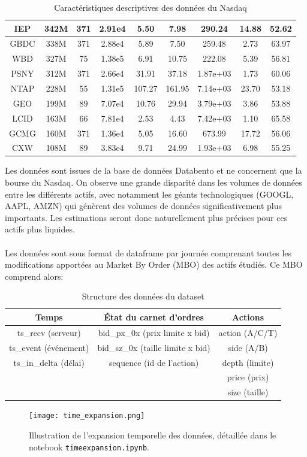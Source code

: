 \documentclass[10pt,a4paper]{article}
\theoremstyle{definition}
\theoremstyle{remark}
\begin{document}
\begin{table}[h!]
\begin{tabular}{|c|c|c|c|c|c|c|c|c|}
IEP & 342M & 371 & 2.91e4 & 5.50 & 7.98 & 290.24 & 14.88 & 52.62 \\ \hline
GBDC & 338M & 371 & 2.88e4 & 5.89 & 7.50 & 259.48 & 2.73 & 63.97 \\ \hline
WBD & 327M & 75 & 1.38e5 & 6.91 & 10.75 & 222.08 & 5.39 & 56.81 \\ \hline
PSNY & 312M & 371 & 2.66e4 & 31.91 & 37.18 & 1.87e+03 & 1.73 & 60.06 \\ \hline
NTAP & 228M & 55 & 1.31e5 & 107.27 & 161.95 & 7.14e+03 & 23.70 & 53.18 \\ \hline
GEO & 199M & 89 & 7.07e4 & 10.76 & 29.94 & 3.79e+03 & 3.86 & 53.88 \\ \hline
LCID & 163M & 66 & 7.81e4 & 2.53 & 4.43 & 7.42e+03 & 1.10 & 65.58 \\ \hline
GCMG & 160M & 371 & 1.36e4 & 5.05 & 16.60 & 673.99 & 17.72 & 56.06 \\ \hline
CXW & 108M & 89 & 3.83e4 & 9.71 & 24.99 & 1.93e+03 & 6.98 & 55.25 \\ \hline
\end{tabular}
\caption{Caractéristiques descriptives des données du Nasdaq}
\label{tab:donnees_nasdaq}
\end{table}

Les données sont issues de la base de données Databento et ne concernent que la bourse du Nasdaq. On observe une grande disparité dans les volumes de données entre les différents actifs, avec notamment les géants technologiques (GOOGL, AAPL, AMZN) qui génèrent des volumes de données significativement plus importants. Les estimations seront donc naturellement plus précises pour ces actifs plus liquides.
\\
\\
Les données sont sous format de dataframe par journée comprenant toutes les modifications apportées au Market By Order (MBO) des actifs étudiés. Ce MBO comprend alors:
\begin{table}[h!]
\centering
\begin{tabular}{|c|c|c|}
\hline
\textbf{Temps} & \textbf{État du carnet d'ordres} & \textbf{Actions} \\
\hline
ts\_recv (serveur) & bid\_px\_0x (prix limite x bid) & action (A/C/T) \\
ts\_event (événement) & bid\_sz\_0x (taille limite x bid) & side (A/B) \\
ts\_in\_delta (délai) & sequence (id de l'action) & depth (limite) \\
& & price (prix) \\
& & size (taille) \\
\hline
\end{tabular}
\caption{Structure des données du dataset}
\end{table}
\begin{figure}[h!]
\centering
        \texttt{[image: time\_expansion.png]}
    \caption{Illustration de l'expansion temporelle des données, détaillée dans le notebook \texttt{timeexpansion.ipynb}.}
    \label{fig:time_expansion}
\end{figure}
\end{document}

